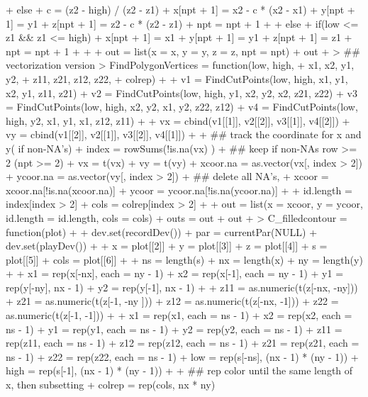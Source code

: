 \documentclass[paper=a4, fontsize=11pt]{report}
\begin{document}
\begin{Schunk}
\begin{Sinput}
{{{+         } else {
+             c = (z2 - high) / (z2 - z1)
+             x[npt + 1] = x2 - c * (x2 - x1)
+             y[npt + 1] = y1
+             z[npt + 1] = z2 - c * (z2 - z1)
+             npt = npt + 1
+         }
+     } else {
+         if(low <= z1 && z1 <= high) {
+             x[npt + 1] = x1
+             y[npt + 1] = y1
+             z[npt + 1] = z1
+             npt = npt + 1
+         }
+     }
+     out = list(x = x, y = y, z = z, npt = npt)
+     out
+ }
> ## vectorization version
> FindPolygonVertices = function(low,  high,
+ 		     x1,  x2,  y1,  y2,
+ 		     z11,  z21,  z12,  z22,
+              colrep){
+ 
+     v1 = FindCutPoints(low, high, x1, y1, x2, y1, z11, z21)
+     v2 = FindCutPoints(low, high, y1, x2, y2, x2, z21, z22)
+     v3 = FindCutPoints(low, high, x2, y2, x1, y2, z22, z12)
+     v4 = FindCutPoints(low, high, y2, x1, y1, x1, z12, z11)
+ 
+     vx = cbind(v1[[1]], v2[[2]], v3[[1]], v4[[2]])
+     vy = cbind(v1[[2]], v2[[1]], v3[[2]], v4[[1]])
+     
+     ##  track the coordinate for x and y( if non-NA's)
+     index = rowSums(!is.na(vx) )
+     ## keep if non-NAs row >= 2 (npt >= 2)
+     vx = t(vx)
+     vy = t(vy)
+     xcoor.na = as.vector(vx[, index > 2])
+     ycoor.na = as.vector(vy[, index > 2])
+     ## delete all NA's,
+     xcoor = xcoor.na[!is.na(xcoor.na)]
+     ycoor = ycoor.na[!is.na(ycoor.na)]
+ 
+     id.length = index[index > 2]
+     cols = colrep[index > 2]
+     
+     out = list(x = xcoor, y = ycoor, id.length = id.length, cols = cols)
+     outs = out
+     out
+ }
> C_filledcontour = function(plot)
+ {
+     dev.set(recordDev())
+     par = currentPar(NULL)
+     dev.set(playDev())
+ 
+     x = plot[[2]]
+     y = plot[[3]]
+     z = plot[[4]]
+     s = plot[[5]]
+     cols = plot[[6]]
+     
+     ns = length(s)
+     nx = length(x)
+     ny = length(y)
+ 
+     x1 = rep(x[-nx], each = ny - 1)
+     x2 = rep(x[-1], each = ny - 1)
+     y1 = rep(y[-ny], nx - 1)
+     y2 = rep(y[-1], nx - 1)
+ 
+     z11 = as.numeric(t(z[-nx, -ny]))
+     z21 = as.numeric(t(z[-1, -ny ]))
+     z12 = as.numeric(t(z[-nx, -1]))
+     z22 = as.numeric(t(z[-1, -1]))
+     
+     x1 = rep(x1, each = ns - 1)
+     x2 = rep(x2, each = ns - 1)
+     y1 = rep(y1, each = ns - 1)
+     y2 = rep(y2, each = ns - 1)
+     z11 = rep(z11, each = ns - 1)
+     z12 = rep(z12, each = ns - 1)
+     z21 = rep(z21, each = ns - 1)
+     z22 = rep(z22, each = ns - 1)
+     low = rep(s[-ns], (nx - 1) * (ny - 1))
+     high = rep(s[-1], (nx - 1) * (ny - 1))
+     
+     ## rep color until the same length of x, then subsetting 
+     colrep = rep(cols, nx * ny)
}
\end{Sinput}
\end{Schunk}
\end{document}

